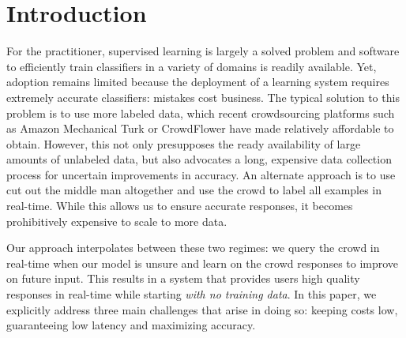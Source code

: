 
\section{Introduction}


For the practitioner, supervised learning is largely a solved problem and software to efficiently train classifiers in a variety of domains is readily available.
Yet, adoption remains limited because the deployment of a learning system requires extremely accurate classifiers: mistakes cost business.
The typical solution to this problem is to use more labeled data, which recent crowdsourcing platforms such as Amazon Mechanical Turk or CrowdFlower have made relatively affordable to obtain.
However, this not only presupposes the ready availability of large amounts of unlabeled data, but also advocates a long, expensive data collection process for uncertain improvements in accuracy.
An alternate approach is to use cut out the middle man altogether and use the crowd to label all examples in real-time\cite{cheng2015flock}. 
While this allows us to ensure accurate responses, it becomes prohibitively expensive to scale to more data. 

Our approach interpolates between these two regimes: we query the crowd in real-time when our model is unsure and learn on the crowd responses to improve on future input.
This results in a system that provides users high quality responses in real-time while starting {\em with no training data}.
In this paper, we explicitly address three main challenges that arise in doing so: keeping costs low, guaranteeing low latency and maximizing accuracy.

